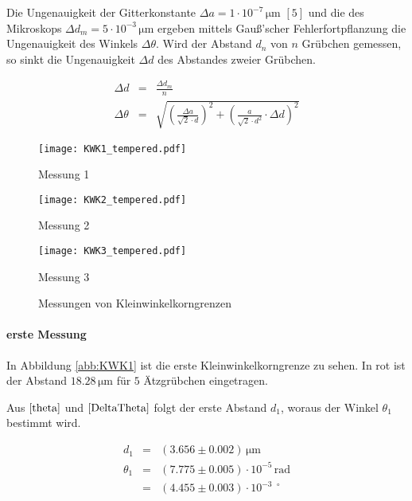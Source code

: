 \documentclass[12pt,a4paper]{scrartcl}
\numberwithin{equation}{section} %
\renewcommand{\[}{} %
\renewcommand{\]}{\noindent} %
\begin{document}
Die Ungenauigkeit der Gitterkonstante \(\Delta a=1 \cdot 10^{-7} \mathrm{\, \mu m}\) \([5]\) und die des Mikroskops \(\Delta d_m = 5 \cdot 10^{-3} \mathrm{\, \mu m}\) ergeben
mittels Gauß'scher Fehlerfortpflanzung die Ungenauigkeit des Winkels
\(\Delta \theta\). Wird der Abstand \(d_n\) von \(n\) Grübchen gemessen,
so sinkt die Ungenauigkeit \(\Delta d\) des Abstandes zweier Grübchen.
\[
\begin{eqnarray}
    \Delta d &=& \frac{\Delta d_m}{n} \\
    \Delta \theta &=& \sqrt{
        \left(\frac{\Delta a}{\sqrt{2} \cdot d} \right)^2
            + \left( \frac{a}{\sqrt{2} \cdot d^2} \cdot \Delta d \right)^2 }
            \label{DeltaTheta}
\end{eqnarray}
\]

\begin{figure}[h]
	\begin{minipage}[t]{.31\linewidth}
		\texttt{[image: KWK1\_tempered.pdf]}
		\caption{Messung 1}
		\label{abb:KWK1}
	\end{minipage}
	\begin{minipage}[t]{.31\linewidth}
		\texttt{[image: KWK2\_tempered.pdf]}
		\caption{Messung 2}
		\label{abb:KWK2}
	\end{minipage}
	\begin{minipage}[t]{.31\linewidth}
		\texttt{[image: KWK3\_tempered.pdf]}
		\caption{Messung 3}
		\label{abb:KWK3}
	\end{minipage}
	\caption*{Messungen von Kleinwinkelkorngrenzen}
\end{figure}


\hypertarget{erste-messung}{%
\paragraph*{erste Messung}\label{erste-messung}}

In Abbildung \ref{abb:KWK1} ist die erste Kleinwinkelkorngrenze zu sehen. In
rot ist der Abstand \(18.28 \mathrm{\, \mu m}\) für \(5\) Ätzgrübchen
eingetragen.

Aus \(\eqref{theta}\) und \(\eqref{DeltaTheta}\) folgt der erste Abstand
\(d_1\), woraus der Winkel \(\theta_1\) bestimmt wird.
\[
\begin{eqnarray}
    d_1 &=& (3.656 \pm 0.002) \mathrm{\, \mu m} \\
    \theta_1 &=& (7.775 \pm 0.005) \cdot 10^{-5} \mathrm{\, rad} \\
        &=& (4.455 \pm 0.003) \cdot 10^{-3\ \ \circ}
\end{eqnarray}
\]
\end{document}
